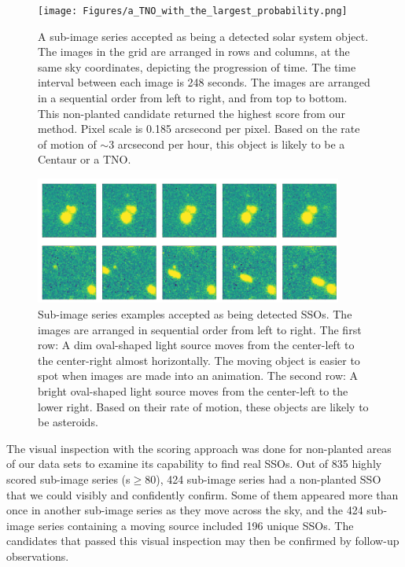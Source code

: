 \documentclass{aastex631}
\begin{document}
\begin{figure}
    \centering
    \texttt{[image: Figures/a\_TNO\_with\_the\_largest\_probability.png]}
    \caption{A sub-image series accepted as being a detected solar system object.
    The images in the grid are arranged in rows and columns, at the same sky coordinates, depicting the progression of time.
    The time interval between each image is 248 seconds.
    The images are arranged in a sequential order from left to right, and from top to bottom.
    This non-planted candidate returned the highest score from our method.
    Pixel scale is 0.185 arcsecond per pixel.
    Based on the rate of motion of $\sim$3 arcsecond per hour, this object is likely to be a Centaur or a TNO.
    }
    \label{fig: a TNO with the largest probability}
\end{figure}

\begin{figure}
    \centering
    \includegraphics[width=0.9\textwidth,keepaspectratio]{Figures/SSO_examples.png}
    \caption{Sub-image series examples accepted as being detected SSOs.
    The images are arranged in sequential order from left to right.
    The first row: A dim oval-shaped light source moves from the center-left to the center-right almost horizontally.
    The moving object is easier to spot when images are made into an animation.
    The second row: A bright oval-shaped light source moves from the center-left to the lower right.
    Based on their rate of motion, these objects are likely to be asteroids.
    }
    \label{fig: SSO examples}
\end{figure}

The visual inspection with the scoring approach was done for non-planted areas of our data sets to examine its capability to find real SSOs.
Out of 835 highly scored sub-image series (s$\geq$80), 424 sub-image series had a non-planted SSO that we could visibly and confidently confirm.
Some of them appeared more than once in another sub-image series as they move across the sky, and the 424 sub-image series containing a moving source included 196 unique SSOs.
The candidates that passed this visual inspection may then be confirmed by follow-up observations.
\end{document}
